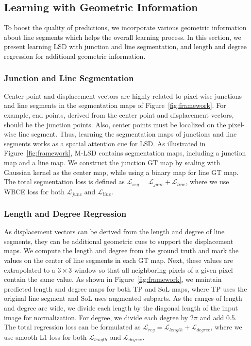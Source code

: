 \documentclass[letterpaper]{article} \usepackage{aaai22}  \usepackage{times}  \usepackage{helvet}  \usepackage{courier}  \usepackage[hyphens]{url}  \usepackage{graphicx} \urlstyle{rm} \def\UrlFont{\rm}  \usepackage{natbib}  \usepackage{caption} \DeclareCaptionStyle{ruled}{labelfont=normalfont,labelsep=colon,strut=off} \frenchspacing  \setlength{\pdfpagewidth}{8.5in}  \setlength{\pdfpageheight}{11in}  \usepackage{algorithm}
\begin{document}
\subsection{Learning with Geometric Information}
To boost the quality of predictions, we incorporate various geometric information about line segments which helps the overall learning process.
In this section, we present learning LSD with junction and line segmentation, and length and degree regression for additional geometric information.


\subsubsection{Junction and Line Segmentation}
Center point and displacement vectors are highly related to pixel-wise junctions and line segments in the segmentation maps of Figure~\ref{fig:framework}.
For example, end points, derived from the center point and displacement vectors, should be the junction points.
Also, center points must be localized on the pixel-wise line segment.
Thus, learning the segmentation maps of junctions and line segments works as a spatial attention cue for LSD.
As illustrated in Figure~\ref{fig:framework}, M-LSD contains segmentation maps, including a junction map and a line map.
We construct the junction GT map by scaling with Gaussian kernel as the center map, while using a binary map for line GT map.
The total segmentation loss is defined as $\mathcal L_{seg} =  \mathcal L_{junc}  + \mathcal L_{line}$, where we use WBCE loss for both $\mathcal L_{junc}$ and $\mathcal L_{line}$.


\subsubsection{Length and Degree Regression}
As displacement vectors can be derived from the length and degree of line segments, they can be additional geometric cues to support the displacement maps.
We compute the length and degree from the ground truth and mark the values on the center of line segments in each GT map.
Next, these values are extrapolated to a $3 \times 3$ window so that all neighboring pixels of a given pixel contain the same value.
As shown in Figure~\ref{fig:framework}, we maintain predicted length and degree maps for both TP and SoL maps, where TP uses the original line segment and SoL uses augmented subparts.
As the ranges of length and degree are wide, we divide each length by the diagonal length of the input image for normalization.
For degree, we divide each degree by $2\pi$ and add 0.5.
The total regression loss can be formulated as $\mathcal L_{reg} = \mathcal L_{length} + \mathcal L_{degree}$, where we use smooth L1 loss for both $\mathcal L_{length}$ and $\mathcal L_{degree}$.
\end{document}
